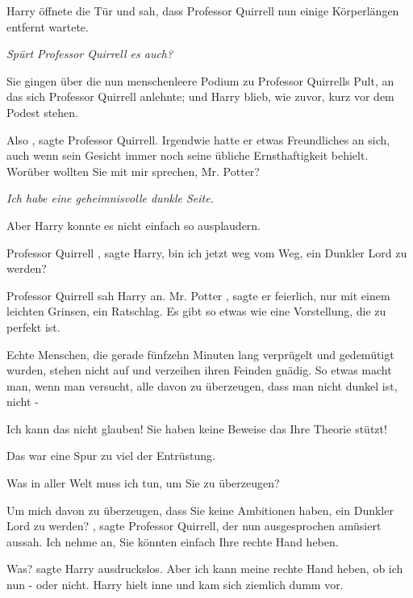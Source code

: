 Harry öffnete die Tür und sah, dass Professor Quirrell nun einige Körperlängen
entfernt wartete.

\emph{ Spürt Professor Quirrell es auch? }

Sie gingen über die nun menschenleere Podium zu Professor Quirrells Pult, an das
sich Professor Quirrell anlehnte; und Harry blieb, wie zuvor, kurz vor dem
Podest stehen.

\glqq Also\grqq{} , sagte Professor Quirrell. Irgendwie hatte er etwas
Freundliches an sich, auch wenn sein Gesicht immer noch seine übliche
Ernsthaftigkeit behielt. \glqq Worüber wollten Sie mit mir sprechen, Mr.
Potter?\grqq{}

\emph{ Ich habe eine geheimnisvolle dunkle Seite.}

Aber Harry konnte es nicht einfach so ausplaudern.

\glqq Professor Quirrell\grqq{} , sagte Harry, \glqq bin ich jetzt weg vom Weg,
ein Dunkler Lord zu werden?\grqq{}

Professor Quirrell sah Harry an. \glqq Mr. Potter\grqq{} , sagte er feierlich,
nur mit einem leichten Grinsen, \glqq ein Ratschlag. Es gibt so etwas wie eine
Vorstellung, die zu perfekt ist.

Echte Menschen, die gerade fünfzehn Minuten lang verprügelt und gedemütigt
wurden, stehen nicht auf und verzeihen ihren Feinden gnädig. So etwas macht man,
wenn man versucht, alle davon zu überzeugen, dass man nicht dunkel ist, nicht
-\grqq{}

\glqq Ich kann das nicht glauben! Sie haben keine Beweise das Ihre Theorie
stützt!\grqq{}

\glqq Das war eine Spur zu viel der Entrüstung.\grqq{}

\glqq Was in aller Welt muss ich tun, um Sie zu überzeugen?\grqq{}

\glqq Um mich davon zu überzeugen, dass Sie keine Ambitionen haben, ein Dunkler
Lord zu werden?\grqq{} , sagte Professor Quirrell, der nun ausgesprochen
amüsiert aussah. \glqq Ich nehme an, Sie könnten einfach Ihre rechte Hand
heben.\grqq{}

\glqq Was?\grqq{} sagte Harry ausdruckslos. \glqq Aber ich kann meine rechte
Hand heben, ob ich nun - oder nicht.\grqq{} Harry hielt inne und kam sich
ziemlich dumm vor.

